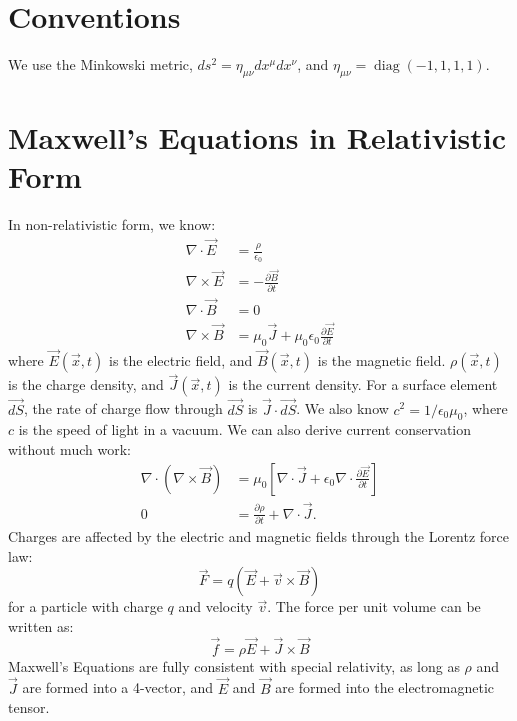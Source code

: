 \documentclass[../Main.tex]{subfiles}
\begin{document}
\section{Conventions}
We use the Minkowski metric, $ds^2 = \eta_{\mu \nu}dx^\mu dx^\nu$, and $\eta_{\mu \nu} = \operatorname{diag}(-1, 1, 1, 1)$.
\section{Maxwell's Equations in Relativistic Form}
In non-relativistic form, we know:
\begin{align}
    \nabla \cdot \vec{E} &= \frac{\rho}{\epsilon_0} \\
    \nabla \times \vec{E} &= -\frac{\partial \vec{B}}{\partial t} \\
    \nabla \cdot \vec{B} &= 0 \\
    \nabla \times \vec{B} &= \mu_0 \vec{J} + \mu_0 \epsilon_0 \frac{\partial \vec{E}}{\partial t}
\end{align}
where $\vec{E}(\vec{x}, t)$ is the electric field, and $\vec{B}(\vec{x}, t)$ is the magnetic field. $\rho(\vec{x}, t)$ is the charge density, and $\vec{J}(\vec{x}, t)$ is the current density. For a surface element $\vec{dS}$, the rate of charge flow through $\vec{dS}$ is $\vec{J} \cdot \vec{dS}$. We also know $c^2 = 1 / \epsilon_0 \mu_0$, where $c$ is the speed of light in a vacuum. We can also derive current conservation without much work:
\begin{align}
    \nabla \cdot (\nabla \times \vec{B}) &= \mu_0 \left[\nabla \cdot \vec{J} + \epsilon_0 \nabla \cdot \frac{\partial \vec{E}}{\partial t}\right] \nonumber \\
    0 &= \frac{\partial \rho}{\partial t} + \nabla \cdot \vec{J}. \label{eqnConserveCharge}
\end{align}
Charges are affected by the electric and magnetic fields through the Lorentz force law:
\begin{equation}
    \vec{F} = q(\vec{E} + \vec{v} \times \vec{B})
    \label{eqnForceLorentz}
\end{equation}
for a particle with charge $q$ and velocity $\vec{v}$. The force per unit volume can be written as:
\begin{equation}
    \vec{f} = \rho \vec{E} + \vec{J} \times \vec{B}
    \label{eqnForceCtsLorentz}
\end{equation}
Maxwell's Equations are fully consistent with special relativity, as long as $\rho$ and $\vec{J}$ are formed into a 4-vector, and $\vec{E}$ and $\vec{B}$ are formed into the electromagnetic tensor.
\end{document}

